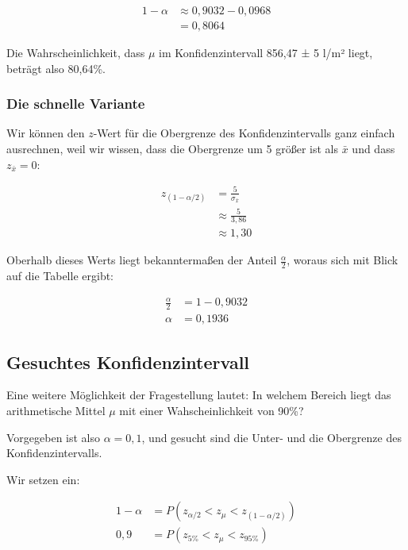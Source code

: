 \documentclass[
  11pt,
  ngerman,
  a4paper,
]{report}
\begin{document}
\nopagebreak

\[
\begin{aligned}
1-\alpha&\approx 0,9032 - 0,0968\\
&=0,8064
\end{aligned}
\]

Die Wahrscheinlichkeit, dass \(\mu\) im Konfidenzintervall 856,47 ± 5 l/m² liegt, beträgt also 80,64\%.

\hypertarget{die-schnelle-variante}{%
\subsubsection{Die schnelle Variante}\label{die-schnelle-variante}}

Wir können den \(z\)-Wert für die Obergrenze des Konfidenzintervalls ganz einfach ausrechnen, weil wir wissen, dass die Obergrenze um 5 größer ist als \(\bar{x}\) und dass \(z_{\bar{x}}=0\):

\nopagebreak

\[\begin{aligned}
z_{(1-\alpha/2)}&=\frac{5}{\sigma_{\bar{x}}}\\
&\approx\frac{5}{3,86}\\
&\approx1{,}30
\end{aligned}\]

Oberhalb dieses Werts liegt bekanntermaßen der Anteil \(\frac{\alpha}{2}\), woraus sich mit Blick auf die Tabelle ergibt:

\nopagebreak

\[\begin{aligned}
\frac{\alpha}{2}&=1-0,9032\\[4pt]
\alpha&=0,1936
\end{aligned}\]

\hypertarget{gesuchtes-konfidenzintervall}{%
\subsection{Gesuchtes Konfidenzintervall}\label{gesuchtes-konfidenzintervall}}

Eine weitere Möglichkeit der Fragestellung lautet: In welchem Bereich liegt das arithmetische Mittel \(\mu\) mit einer Wahscheinlichkeit von 90\%?

Vorgegeben ist also \(\alpha=0{,}1\), und gesucht sind die Unter- und die Obergrenze des Konfidenzintervalls.

Wir setzen ein:

\nopagebreak

\[\begin{aligned}
1-\alpha&=P(z_{\alpha/2} < z_{\mu} < z_{(1-\alpha/2)})\\[4pt]
0{,}9 &= P(z_{5\%} < z_{\mu} < z_{95\%})
\end{aligned}\]
\end{document}
